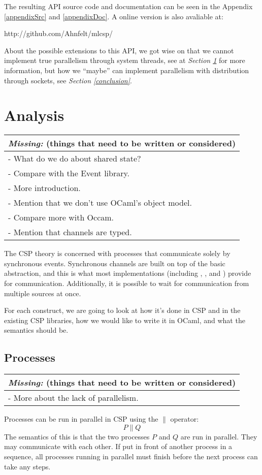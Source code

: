 \documentclass[a4paper,12pt]{article}
\newcommand{\missing}[1]{
  \begin{tabular}{|p{11cm}|}
    \hline
    \emph{Missing:} {\scriptsize (things that need to be written or considered)} \\
    \hline
    #1
    \hline
  \end{tabular}
}
\begin{document}
The resulting API source code and documentation can be seen in the Appendix
\ref{appendixSrc} and \ref{appendixDoc}. A online version is also avaliable at:

\begin{center}
http://github.com/Ahnfelt/mlcsp/
\end{center}

About the possible extensions to this API, we got wise on that we cannot
implement true parallelism through system threads, see at {\it Section
\ref{analysis}} for more information, but how we ``maybe'' can implement
parallelism with distribution through sockets, see {\it Section 
\ref{conclusion}}.

\section{Analysis}
\label{analysis}
\missing{
- What do we do about shared state?\\
- Compare with the Event library.\\
- More introduction.\\
- Mention that we don't use OCaml's object model.\\
- Compare more with Occam.\\
- Mention that channels are typed.\\
}

The CSP theory is concerned with processes that communicate solely by synchronous 
events. Synchronous channels are built on top of the basic abstraction, and this is
what most implementations (including \cite{occam}, \cite{c++csp}, \cite{jcsp} and 
\cite{pycsp}) provide for communication. 
Additionally, it is possible to wait for communication from multiple sources at once.

For each construct, we are going to look at how it's done in CSP and in the 
existing CSP libraries, how we would like to write it in OCaml, and what the 
semantics should be.

\subsection{Processes}
\missing{
- More about the lack of parallelism.\\
}

Processes can be run in parallel in CSP using the $\parallel$ operator:
\[P \parallel Q\]
The semantics of this is that the two processes $P$ and $Q$ are run in parallel. They
may communicate with each other. If put in front of another process in a sequence, all
processes running in parallel must finish before the next process can take any steps.
\end{document}
